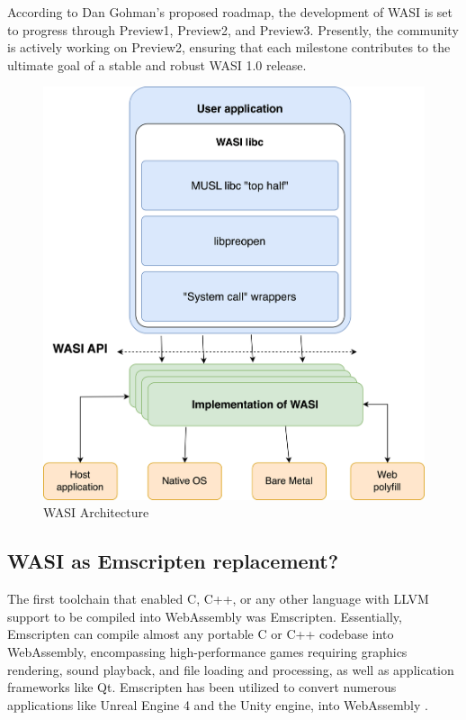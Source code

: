 According to Dan Gohman's proposed roadmap, the development of WASI is set to progress through Preview1, Preview2, and Preview3. Presently, the community is actively working on Preview2, ensuring that each milestone contributes to the ultimate goal of a stable and robust WASI 1.0 release. 

\begin{figure}[H]
	\centering
		\includegraphics[width=130mm,scale=0.8]{images/wasm/WASI_Architecture.png}
	\caption{WASI Architecture}
	\label{fig:wasi-architecture}
\end{figure}

\subsection{WASI as Emscripten replacement?}
The first toolchain that enabled C, C++, or any other language with \gls{LLVM} support to be compiled into WebAssembly was Emscripten. Essentially, Emscripten can compile almost any portable C or C++ codebase into WebAssembly, encompassing high-performance games requiring graphics rendering, sound playback, and file loading and processing, as well as application frameworks like Qt. Emscripten has been utilized to convert numerous applications like Unreal Engine 4 and the Unity engine, into WebAssembly \cite{emscriptencommunity_2023_emscripten}. 

